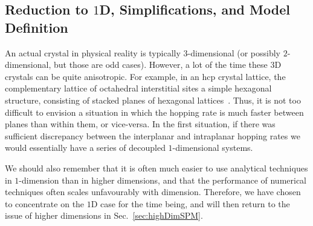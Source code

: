 \subsection{Reduction to $1$D, Simplifications, and Model Definition}
An actual crystal in physical reality is typically $3$-dimensional (or possibly $2$-dimensional, but those
are odd cases). However, a lot of the time these $3$D crystals can be quite anisotropic. For example, in
an hcp crystal lattice, the complementary lattice of octahedral interstitial sites a simple hexagonal
structure, consisting of stacked planes of hexagonal lattices~\cite{Li2018}. Thus, it is not too difficult to envision
a situation in which the hopping rate is much faster between planes than within them, or vice-versa. In the
first situation, if there was sufficient discrepancy between the interplanar and intraplanar hopping rates
we would essentially have a series of decoupled $1$-dimensional systems.

We should also remember that it is often much easier to use analytical techniques in $1$-dimension than
in higher dimensions, and that the performance of numerical techniques often scales unfavourably 
with dimension. Therefore, we have chosen to concentrate on the $1$D case for the time being, and will then
return to the issue of higher dimensions in Sec.~\ref{sec:highDimSPM}.

